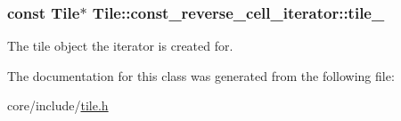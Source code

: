 \subsubsection[{tile\+\_\+}]{\setlength{\rightskip}{0pt plus 5cm}const {\bf Tile}$\ast$ Tile\+::const\+\_\+reverse\+\_\+cell\+\_\+iterator\+::tile\+\_\+\hspace{0.3cm}{\ttfamily [private]}}\label{classTile_1_1const__reverse__cell__iterator_ac7fd010d43770d5816c3f98d0fa766be}
The tile object the iterator is created for. 

The documentation for this class was generated from the following file\+:\begin{DoxyCompactItemize}
\item 
core/include/\hyperlink{tile_8h}{tile.\+h}\end{DoxyCompactItemize}
